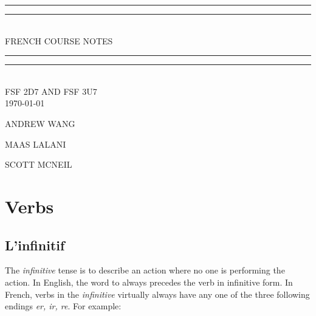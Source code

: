 \documentclass[11pt, oneside]{book}
\begin{document}
\newcommand*{\titleGP}{\begingroup %
		\centering %
		\vspace*{\baselineskip} %

		\rule{\textwidth}{1.6pt}\vspace*{-\baselineskip}\vspace*{2pt} %
		\rule{\textwidth}{0.4pt}\\[\baselineskip] %

		{\LARGE FRENCH COURSE NOTES}\\[0.2\baselineskip] %

\rule{\textwidth}{0.4pt}\vspace*{-\baselineskip}\vspace{3.2pt} %
\rule{\textwidth}{1.6pt}\\[1.5\baselineskip] %

\scshape %
FSF 2D7 AND FSF 3U7\\[0.7\baselineskip]
\today \par %

\vspace*{2\baselineskip} %

\vspace{0.7\baselineskip}
{\Large ANDREW WANG\par}
{\Large MAAS LALANI\par}
{\Large SCOTT MCNEIL\par} %

\vfill %

\endgroup}
\titleGP


\tableofcontents

\chapter{Verbs}
\section{L'infinitif}
The \textit{infinitive} tense is to describe an action where no one is performing the action. In English, the word to always precedes the verb in infinitive form. In French, verbs in the \textit{infinitive} virtually always have any one of the three following endings \textit{er, ir, re}. 
\vspace{\baselineskip}
For example:
\end{document}
